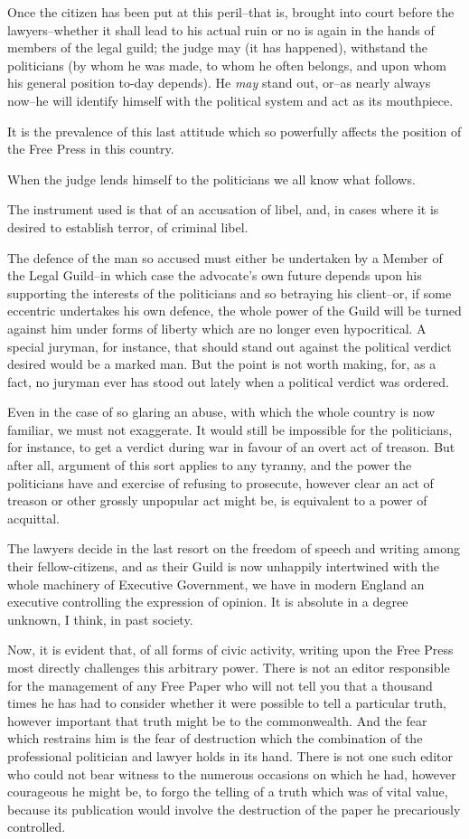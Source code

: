 \documentclass{book}
\begin{document}
Once the citizen has been put at this peril–that is, brought into court before the lawyers–whether it shall lead to his actual ruin or no is again in the hands of members of the legal guild; the judge may (it has happened), withstand the politicians (by whom he was made, to whom he often belongs, and upon whom his general position to-day depends). He \emph{may} stand out, or–as nearly always now–he will identify himself with the political system and act as its mouthpiece.

It is the prevalence of this last attitude which so powerfully affects the position of the Free Press in this country.

When the judge lends himself to the politicians we all know what follows.

The instrument used is that of an accusation of libel, and, in cases where it is desired to establish terror, of criminal libel.

The defence of the man so accused must either be undertaken by a Member of the Legal Guild–in which case the advocate’s own future depends upon his supporting the interests of the politicians and so betraying his client–or, if some eccentric undertakes his own defence, the whole power of the Guild will be turned against him under forms of liberty which are no longer even hypocritical. A special juryman, for instance, that should stand out against the political verdict desired would be a marked man. But the point is not worth making, for, as a fact, no juryman ever has stood out lately when a political verdict was ordered.

Even in the case of so glaring an abuse, with which the whole country is now familiar, we must not exaggerate. It would still be impossible for the politicians, for instance, to get a verdict during war in favour of an overt act of treason. But after all, argument of this sort applies to any tyranny, and the power the politicians have and exercise of refusing to prosecute, however clear an act of treason or other grossly unpopular act might be, is equivalent to a power of acquittal.

The lawyers decide in the last resort on the freedom of speech and writing among their fellow-citizens, and as their Guild is now unhappily intertwined with the whole machinery of Executive Government, we have in modern England an executive controlling the expression of opinion. It is absolute in a degree unknown, I think, in past society.

Now, it is evident that, of all forms of civic activity, writing upon the Free Press most directly challenges this arbitrary power. There is not an editor responsible for the management of any Free Paper who will not tell you that a thousand times he has had to consider whether it were possible to tell a particular truth, however important that truth might be to the commonwealth. And the fear which restrains him is the fear of destruction which the combination of the professional politician and lawyer holds in its hand. There is not one such editor who could not bear witness to the numerous occasions on which he had, however courageous he might be, to forgo the telling of a truth which was of vital value, because its publication would involve the destruction of the paper he precariously controlled.
\end{document}
